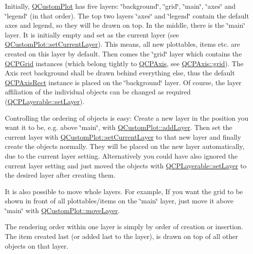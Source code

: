 Initially, \hyperlink{class_q_custom_plot}{Q\+Custom\+Plot} has five layers\+: \char`\"{}background\char`\"{}, \char`\"{}grid\char`\"{}, \char`\"{}main\char`\"{}, \char`\"{}axes\char`\"{} and \char`\"{}legend\char`\"{} (in that order). The top two layers \char`\"{}axes\char`\"{} and \char`\"{}legend\char`\"{} contain the default axes and legend, so they will be drawn on top. In the middle, there is the \char`\"{}main\char`\"{} layer. It is initially empty and set as the current layer (see \hyperlink{class_q_custom_plot_a73a6dc47c653bb6f8f030abca5a11852}{Q\+Custom\+Plot\+::set\+Current\+Layer}). This means, all new plottables, items etc. are created on this layer by default. Then comes the \char`\"{}grid\char`\"{} layer which contains the \hyperlink{class_q_c_p_grid}{Q\+C\+P\+Grid} instances (which belong tightly to \hyperlink{class_q_c_p_axis}{Q\+C\+P\+Axis}, see \hyperlink{class_q_c_p_axis_ac4fb913cce3072b5e75a4635e0f6cd04}{Q\+C\+P\+Axis\+::grid}). The Axis rect background shall be drawn behind everything else, thus the default \hyperlink{class_q_c_p_axis_rect}{Q\+C\+P\+Axis\+Rect} instance is placed on the \char`\"{}background\char`\"{} layer. Of course, the layer affiliation of the individual objects can be changed as required (\hyperlink{class_q_c_p_layerable_ab0d0da6d2de45a118886d2c8e16d5a54}{Q\+C\+P\+Layerable\+::set\+Layer}).

Controlling the ordering of objects is easy\+: Create a new layer in the position you want it to be, e.\+g. above \char`\"{}main\char`\"{}, with \hyperlink{class_q_custom_plot_ad5255393df078448bb6ac83fa5db5f52}{Q\+Custom\+Plot\+::add\+Layer}. Then set the current layer with \hyperlink{class_q_custom_plot_a73a6dc47c653bb6f8f030abca5a11852}{Q\+Custom\+Plot\+::set\+Current\+Layer} to that new layer and finally create the objects normally. They will be placed on the new layer automatically, due to the current layer setting. Alternatively you could have also ignored the current layer setting and just moved the objects with \hyperlink{class_q_c_p_layerable_ab0d0da6d2de45a118886d2c8e16d5a54}{Q\+C\+P\+Layerable\+::set\+Layer} to the desired layer after creating them.

It is also possible to move whole layers. For example, If you want the grid to be shown in front of all plottables/items on the \char`\"{}main\char`\"{} layer, just move it above \char`\"{}main\char`\"{} with \hyperlink{class_q_custom_plot_ae896140beff19424e9e9e02d6e331104}{Q\+Custom\+Plot\+::move\+Layer}.

The rendering order within one layer is simply by order of creation or insertion. The item created last (or added last to the layer), is drawn on top of all other objects on that layer.

